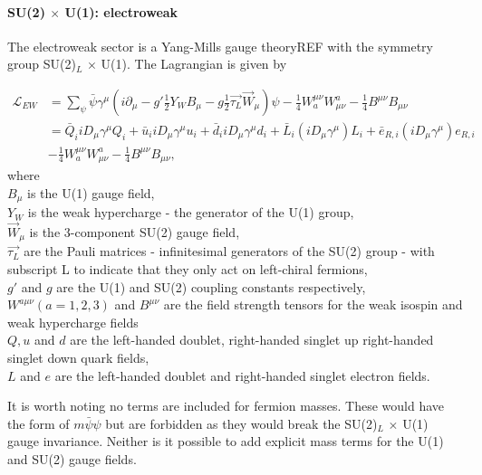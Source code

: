 \paragraph{SU(2) $\times$ U(1): electroweak}
The electroweak sector is a Yang-Mills gauge theoryREF with the symmetry group SU(2)$_L$ $\times$ U(1). The Lagrangian is given by

\begin{equation}
\begin{split}
\mathcal{L}_{EW} &= \sum_{\psi} \bar{\psi} \gamma^\mu \left(i\partial_\mu - g' \frac{1}{2}Y_W B_\mu - g \frac{1}{2} \overrightarrow{\tau_L} \overrightarrow{W}_\mu \right) \psi - \frac{1}{4} W^{\mu\nu}_a W^{a}_{\mu\nu} -\frac{1}{4} B^{\mu\nu} B_{\mu\nu} \\ 
&= \bar{Q}_i i D_\mu \gamma^\mu Q_i + \bar{u}_i i D_\mu \gamma^\mu u_i + \bar{d}_i i D_\mu \gamma^\mu d_i + \bar{L}_i\left(iD_\mu\gamma^\mu\right)L_i + \bar{e}_{R,i}\left(iD_\mu\gamma^\mu\right)e_{R,i} \\ &
- \frac{1}{4} W^{\mu\nu}_a W^{a}_{\mu\nu} -\frac{1}{4} B^{\mu\nu} B_{\mu\nu},
\end{split}
\end{equation}
where\\
\indent $B_\mu$ is the U(1) gauge field,\\
\indent $Y_W$ is the weak hypercharge - the generator of the U(1) group,\\
\indent $\overrightarrow{W}_\mu$ is the 3-component SU(2) gauge field,\\
\indent $\overrightarrow{\tau_L}$ are the Pauli matrices - infinitesimal generators of the SU(2) group - with subscript L to indicate that they only act on left-chiral fermions,\\
\indent $g'$ and $g$ are the U(1) and SU(2) coupling constants respectively,\\
\indent $W^{a\mu\nu} (a=1,2,3)$ and $B^{\mu\nu}$ are the field strength tensors for the weak isospin and weak hypercharge fields\\
\indent $Q, u$ and $d$ are the left-handed doublet, right-handed singlet up right-handed singlet down quark fields,\\
\indent $L$ and $e$ are the left-handed doublet and right-handed singlet electron fields.

It is worth noting no terms are included for fermion masses. These would have the form of $m\bar{\psi}\psi$ but are forbidden as they would break the SU(2)$_L$ $\times$ U(1) gauge invariance. Neither is it possible to add explicit mass terms for the U(1) and SU(2) gauge fields. 
